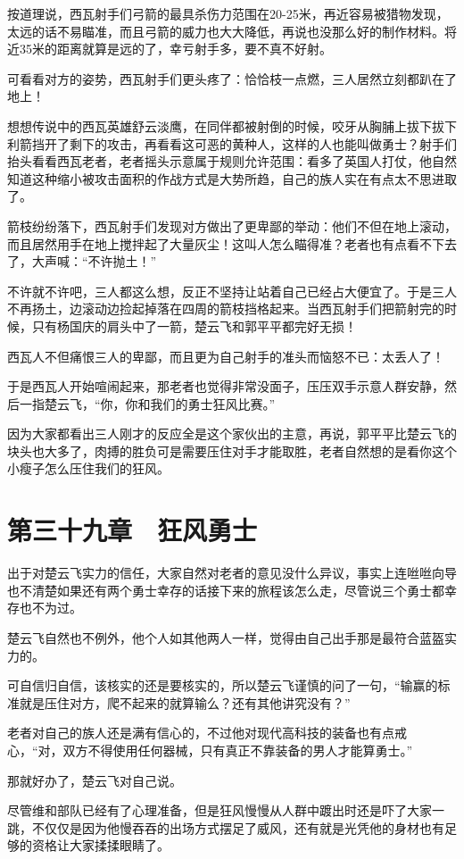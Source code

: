 按道理说，西瓦射手们弓箭的最具杀伤力范围在20-25米，再近容易被猎物发现，太远的话不易瞄准，而且弓箭的威力也大大降低，再说也没那么好的制作材料。将近35米的距离就算是远的了，幸亏射手多，要不真不好射。

可看看对方的姿势，西瓦射手们更头疼了：恰恰枝一点燃，三人居然立刻都趴在了地上！

想想传说中的西瓦英雄舒云淡鹰，在同伴都被射倒的时候，咬牙从胸脯上拔下拔下利箭挡开了剩下的攻击，再看看这可恶的黄种人，这样的人也能叫做勇士？射手们抬头看看西瓦老者，老者摇头示意属于规则允许范围：看多了英国人打仗，他自然知道这种缩小被攻击面积的作战方式是大势所趋，自己的族人实在有点太不思进取了。

箭枝纷纷落下，西瓦射手们发现对方做出了更卑鄙的举动：他们不但在地上滚动，而且居然用手在地上搅拌起了大量灰尘！这叫人怎么瞄得准？老者也有点看不下去了，大声喊：“不许抛土！”

不许就不许吧，三人都这么想，反正不坚持让站着自己已经占大便宜了。于是三人不再扬土，边滚动边捡起掉落在四周的箭枝挡格起来。当西瓦射手们把箭射完的时候，只有杨国庆的肩头中了一箭，楚云飞和郭平平都完好无损！

西瓦人不但痛恨三人的卑鄙，而且更为自己射手的准头而恼怒不已：太丢人了！

于是西瓦人开始喧闹起来，那老者也觉得非常没面子，压压双手示意人群安静，然后一指楚云飞，“你，你和我们的勇士狂风比赛。”

因为大家都看出三人刚才的反应全是这个家伙出的主意，再说，郭平平比楚云飞的块头也大多了，肉搏的胜负可是需要压住对手才能取胜，老者自然想的是看你这个小瘦子怎么压住我们的狂风。

\section{第三十九章　狂风勇士}

出于对楚云飞实力的信任，大家自然对老者的意见没什么异议，事实上连咝咝向导也不清楚如果还有两个勇士幸存的话接下来的旅程该怎么走，尽管说三个勇士都幸存也不为过。

楚云飞自然也不例外，他个人如其他两人一样，觉得由自己出手那是最符合蓝盔实力的。

可自信归自信，该核实的还是要核实的，所以楚云飞谨慎的问了一句，“输赢的标准就是压住对方，爬不起来的就算输么？还有其他讲究没有？”

老者对自己的族人还是满有信心的，不过他对现代高科技的装备也有点戒心，“对，双方不得使用任何器械，只有真正不靠装备的男人才能算勇士。”

那就好办了，楚云飞对自己说。

尽管维和部队已经有了心理准备，但是狂风慢慢从人群中踱出时还是吓了大家一跳，不仅仅是因为他慢吞吞的出场方式摆足了威风，还有就是光凭他的身材也有足够的资格让大家揉揉眼睛了。

